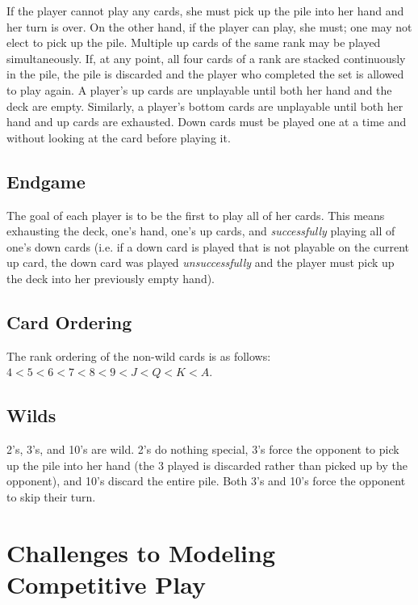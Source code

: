 \documentclass[paper=a4, fontsize=11pt]{scrartcl}
\numberwithin{equation}{section}		%
\numberwithin{figure}{section}			%
\numberwithin{table}{section}				%
\begin{document}
If the player cannot play any cards, she must pick up the pile into her hand and her turn is over. On the other hand, if the player can play, she must; one may not elect to pick up the pile. Multiple up cards of the same rank may be played simultaneously. If, at any point, all four cards of a rank are stacked continuously in the pile, the pile is discarded and the player who completed the set is allowed to play again. A player's up cards are unplayable until both her hand and the deck are empty. Similarly, a player's bottom cards are unplayable until both her hand and up cards are exhausted. Down cards must be played one at a time and without looking at the card before playing it. 
	
\subsection{Endgame}
The goal of each player is to be the first to play all of her cards. This means exhausting the deck, one's hand, one's up cards, and \emph{successfully} playing all of one's down cards (i.e. if a down card is played that is not playable on the current up card, the down card was played \emph{unsuccessfully} and the player must pick up the deck into her previously empty hand). 
	
\subsection{Card Ordering}
The rank ordering of the non-wild cards is as follows: $4 < 5 < 6 < 7< 8 < 9 < J < Q < K < A$. 
	
\subsection{Wilds}
2's, 3's, and 10's are wild. 2's do nothing special, 3's force the opponent to pick up the pile into her hand (the 3 played is discarded rather than picked up by the opponent), and 10's discard the entire pile. Both 3's and 10's force the opponent to skip their turn. 


\section{Challenges to Modeling Competitive Play}
\end{document}
